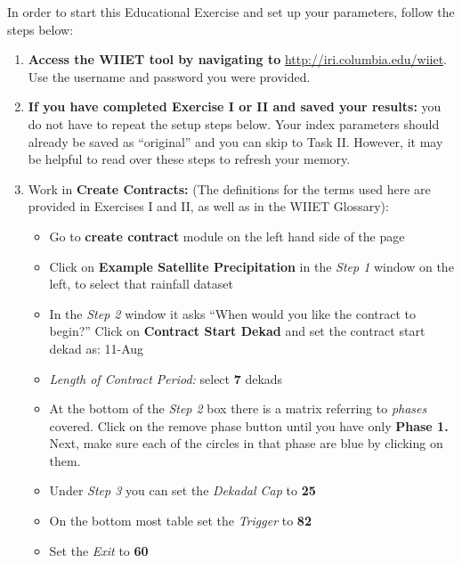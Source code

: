 \documentclass[letterpaper,10pt,english]{sphinxmanual}
\begin{document}
In order to start this Educational Exercise and set up your parameters, follow the steps below:
\begin{enumerate}
\item {} 
\textbf{Access the WIIET tool by navigating to} \href{http://iri.columbia.edu/wiiet}{http://iri.columbia.edu/wiiet}. Use the username and password you were provided.

\item {} 
\textbf{If you have completed Exercise I or II and saved your results:} you do not have to repeat the setup steps below. Your index parameters should already be saved as ``original'' and you can skip to Task II. However, it may be helpful to read over these steps to refresh your memory.

\item {} 
Work in \textbf{Create Contracts:} (The definitions for the terms used here are provided in Exercises I and II, as well as in the WIIET Glossary):
\begin{itemize}
\item {} 
Go to \textbf{create contract} module on the left hand side of the page

\item {} 
Click on \textbf{Example Satellite Precipitation} in the \emph{Step 1} window on the left, to select that rainfall dataset

\item {} 
In the \emph{Step 2} window it asks ``When would you like the contract to begin?'' Click on \textbf{Contract Start Dekad} and set the contract start dekad as: 11-Aug

\item {} 
\emph{Length of Contract Period:} select \textbf{7} dekads

\item {} 
At the bottom of the \emph{Step 2} box there is a matrix referring to \emph{phases} covered. Click on the remove phase button until you have only \textbf{Phase 1.} Next, make sure each of the circles in that phase are blue by clicking on them.

\item {} 
Under \emph{Step 3} you can set the \emph{Dekadal Cap} to \textbf{25}

\item {} 
On the bottom most table set the \emph{Trigger} to \textbf{82}

\item {} 
Set the \emph{Exit} to \textbf{60}


\end{itemize}
\end{enumerate}
\end{document}
